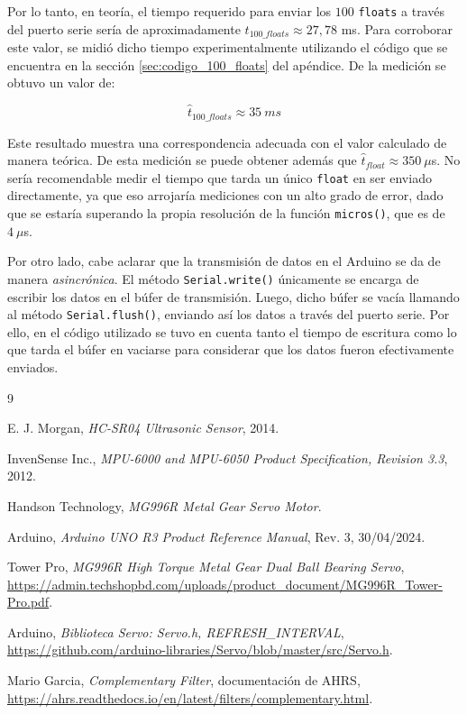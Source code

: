 \documentclass[a4paper, twoside, 10pt, spanish]{article}
\numberwithin{table}{section}
\begin{document}
Por lo tanto, en teoría, el tiempo requerido para enviar los $100$ \texttt{floats} a través del puerto serie sería de aproximadamente $t_{100\_floats} \approx 27,78$ ms. Para corroborar este valor, se midió dicho tiempo experimentalmente utilizando el código que se encuentra en la sección \ref{sec:codigo_100_floats} del apéndice. De la medición se obtuvo un valor de:

\begin{equation}
    \hat{t}_{100\_floats} \approx 35 \ ms
\end{equation}

Este resultado muestra una correspondencia adecuada con el valor calculado de manera teórica. De esta medición se puede obtener además que $\hat{t}_{float} \approx 350 \ \mu$s. No sería recomendable medir el tiempo que tarda un único \texttt{float} en ser enviado directamente, ya que eso arrojaría mediciones con un alto grado de error, dado que se estaría superando la propia resolución de la función \texttt{micros()}, que es de $4 \ \mu$s.

Por otro lado, cabe aclarar que la transmisión de datos en el Arduino se da de manera \textit{asincrónica}. El método \texttt{Serial.write()} únicamente se encarga de escribir los datos en el búfer de transmisión. Luego, dicho búfer se vacía llamando al método \texttt{Serial.flush()}, enviando así los datos a través del puerto serie. Por ello, en el código utilizado se tuvo en cuenta tanto el tiempo de escritura como lo que tarda el búfer en vaciarse para considerar que los datos fueron efectivamente enviados.

\begin{thebibliography}{9}

E. J. Morgan,
\textit{HC-SR04 Ultrasonic Sensor},
2014.

InvenSense Inc.,
\textit{MPU-6000 and MPU-6050 Product Specification, Revision 3.3},
2012.

Handson Technology,
\textit{MG996R Metal Gear Servo Motor}.

Arduino,
\textit{Arduino UNO R3 Product Reference Manual},
Rev. 3, 30/04/2024.

Tower Pro,
\textit{MG996R High Torque Metal Gear Dual Ball Bearing Servo},
\url{https://admin.techshopbd.com/uploads/product_document/MG996R_Tower-Pro.pdf}.

Arduino,
\textit{Biblioteca Servo: Servo.h, REFRESH\_INTERVAL},
\url{https://github.com/arduino-libraries/Servo/blob/master/src/Servo.h}.

Mario Garcia,
\textit{Complementary Filter}, documentación de AHRS,
\url{https://ahrs.readthedocs.io/en/latest/filters/complementary.html}.

\end{thebibliography}
\end{document}
